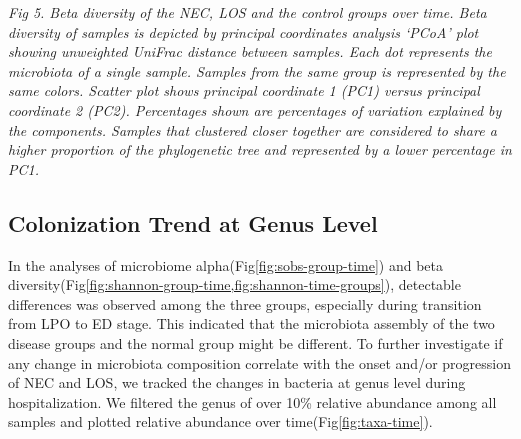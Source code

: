 \documentclass[fleqn,10pt]{wlpeerj} %
\begin{document}
    \emph{Fig 5. Beta diversity of the NEC, LOS and the control groups over time. Beta diversity of samples is depicted by principal coordinates analysis ‘PCoA’ plot showing unweighted UniFrac distance between samples. Each dot represents the microbiota of a single sample.  Samples from the same group is represented by the same colors. Scatter plot shows principal coordinate 1 (PC1) versus principal coordinate 2 (PC2). Percentages shown are percentages of variation explained by the components. Samples that clustered closer together are considered to share a higher proportion of the phylogenetic tree and represented by a lower percentage in PC1.}

  \subsection*{Colonization Trend at Genus Level}
  In the analyses of microbiome alpha(Fig\ref{fig:sobs-group-time}) and beta diversity(Fig\ref{fig:shannon-group-time,fig:shannon-time-groups}), detectable differences was observed among the three groups, especially during transition from LPO to ED stage.  This indicated that the microbiota assembly of the two disease groups and the normal group might be different.  To further investigate if any change in microbiota composition correlate with the onset and/or progression of NEC and LOS, we tracked the changes in bacteria at genus level during hospitalization.  We filtered the genus of over 10\% relative abundance among all samples and plotted relative abundance over time(Fig\ref{fig:taxa-time}). \\
\end{document}
